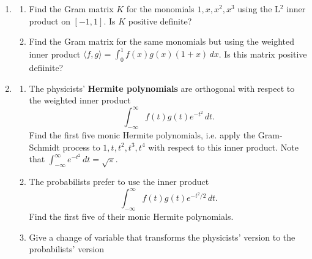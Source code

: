 \documentclass[12pt]{article}
\begin{document}
\begin{enumerate}
	\bigskip
	
	\item 
		\begin{enumerate}
			\item Find the Gram matrix $K$ for the monomials $1,x,x^2,x^3$ using the L$^2$ inner product on $[-1,1]$. Is $K$ positive definite?
			\item Find the Gram matrix for the same monomials but using the weighted inner product $\langle f,g\rangle=\int_0^1f(x)g(x)(1+x)\,dx$. Is this matrix positive defiinite?		
		\end{enumerate}
		
	\bigskip
	
	\item 
		\begin{enumerate}
			\item The physicists' \textbf{Hermite polynomials} are orthogonal with respect to the weighted inner product
				\[
					\int_{-\infty}^\infty f(t)g(t)e^{-t^2}\,dt.
				\]
				Find the first five monic Hermite polynomials, i.e. apply the Gram-Schmidt process to $1,t, t^2,t^3,t^4$ with respect to this inner product. Note that $\int_{-\infty}^\infty e^{-t^2}\,dt=\sqrt{\pi}.$
			\item The probabilists prefer to use the inner product
				\[
					\int_{-\infty}^\infty f(t)g(t)e^{-t^2/2}\,dt.
				\]
				Find the first five of their monic Hermite polynomials. 
				\item Give a change of variable that transforms the physicists' version to the probabilists' version
		\end{enumerate}
\end{enumerate}
\end{document}
